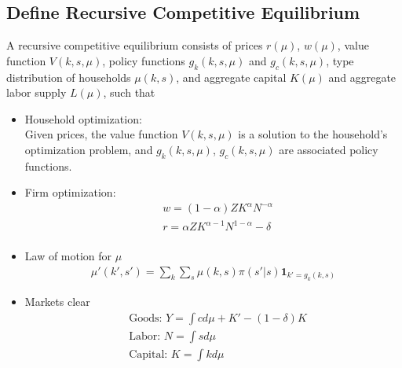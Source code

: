 \documentclass{article}
\begin{document}
\begin{spacing}{1.5}
\subsection{Define Recursive Competitive Equilibrium}
A recursive competitive equilibrium consists of prices $r(\mu)$, $w(\mu)$, value function $V(k,s,\mu)$, policy functions $g_k(k,s,\mu)$ and $g_c(k,s,\mu)$, type distribution of households $\mu(k,s)$, and aggregate capital $K(\mu)$ and aggregate labor supply $L(\mu)$, such that
\begin{itemize}
\item Household optimization:\\
Given prices, the value function $V(k,s,\mu)$ is a solution to the household's optimization problem, and $g_k(k,s,\mu)$, $g_c(k,s,\mu)$ are associated policy functions.
\item Firm optimization:
\begin{align*}
&w=(1-\alpha)ZK^{\alpha}N^{-\alpha}\\
&r=\alpha ZK^{\alpha-1}N^{1-\alpha}-\delta\\
\end{align*}
\item Law of motion for $\mu$
\begin{align*}
\mu'(k',s')=\sum_k\sum_s \mu(k,s)\pi(s'|s)\textbf{1}_{{k'=g_k(k,s)}}
\end{align*}
\item Markets clear
\begin{align*}
&\text{Goods: } Y=\int c d\mu+K'-(1-\delta)K\\
&\text{Labor: } N=\int s d\mu\\
&\text{Capital: } K=\int k d\mu\\
\end{align*}
\end{itemize}
\newpage




\end{spacing}
\end{document}
